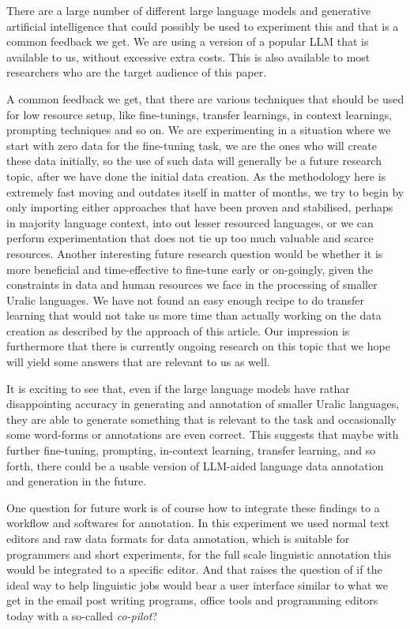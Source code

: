\documentclass[free]{flammie}
\begin{document}
There are a large number of different large language models and generative
artificial intelligence that could possibly be used to experiment this and that
is a common feedback we get.  We are using a version of a popular LLM that is
available to us, without excessive extra costs.  This is also available to most
researchers who are the target audience of this paper.

A common feedback we get, that there are various techniques that should be used
for low resource setup, like fine-tunings, transfer learnings,  in context
learnings, prompting techniques and so on.  We are experimenting in a situation
where we start with zero data for the fine-tuning task, we are the ones who will
create these data initially, so the use of such data will generally be a future
research topic, after we have done the initial data creation.  As the
methodology here is extremely fast moving and outdates itself in matter of
months, we try to begin by only importing either approaches that have been
proven and stabilised, perhaps in majority language context, into out lesser
resourced languages, or we can perform experimentation that does not tie up too
much valuable and scarce resources.  Another interesting future research
question would be whether it is more beneficial and time-effective to fine-tune
early or on-goingly, given the constraints in data and human resources we face
in the processing of smaller Uralic languages.  We have not found an easy enough
recipe to do transfer learning that would not take us more time than actually
working on the data creation as described by the approach of this article.  Our
impression is furthermore that there is currently ongoing research on this topic
that we hope will yield some answers that are relevant to us as well.


It is exciting to see that, even if the large language models have rathar
disappointing accuracy in generating and annotation of smaller Uralic languages,
they are able to generate something that is relevant to the task and
occasionally some word-forms or annotations are even correct.  This suggests
that maybe with further fine-tuning, prompting, in-context learning, transfer
learning, and so forth, there could be a usable version of LLM-aided language
data annotation and generation in the future.

One question for future work is of course how to integrate these findings to a
workflow and softwares for annotation.  In this experiment we used normal text
editors and raw data formats for data annotation, which is suitable for
programmers and short experiments, for the full scale linguistic annotation this
would be integrated to a specific editor.  And that raises the question of if
the ideal way to help linguistic jobs would bear a user interface similar to
what we get in the email post writing programs, office tools and programming
editors today with a so-called \textit{co-pilot}?
\end{document}
